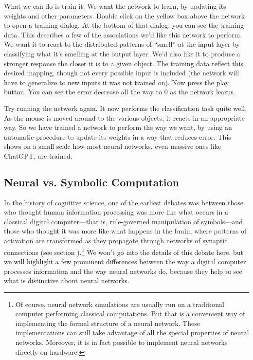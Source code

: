 What we can do is train it. We want the network to learn, by updating its weights and other parameters.  Double click on the yellow box above the network to open a training dialog. At the bottom of that dialog, you can see the training data. This describes a few of the associations we'd like this network to perform.  We want it to react to the distributed patterns of ``smell'' at the input layer by classifying what it's smelling at the output layer. We'd also like it to produce a stronger response the closer it is to a given object.  The training data reflect this desired mapping, though not every possible input is included (the network will have to generalize to new inputs it was not trained on). Now press the play button. You can see the error decrease all the way to 0 as the network learns.

Try running the network again. It now performs the classification task quite well.  As the mouse is moved around to the various objects, it reacts in an appropriate way. So we have trained a network to perform the way we want, by using an automatic procedure to update its weights in a way that reduces error. This shows on a small scale how most neural networks, even massive ones like ChatGPT, are trained.


\subsection{Neural vs. Symbolic Computation}\label{classicalAIComparison}

In the history of cognitive science, one of the earliest debates was between those who thought human information processing was more like what occurs in a classical digital computer---that is, rule-governed manipulation of symbols---and those who thought it was more like what happens in the brain, where patterns of activation are transformed as they propagate through networks of synaptic connections (see section ).\footnote{Of course, neural network simulations are usually run on a traditional computer performing classical computations. But that is a convenient way of implementing the formal structure of a neural network. These implementations can still take advantage of all the special properties of neural networks. Moreover, it is in fact possible to implement neural networks directly on hardware.} We won't go into the details of this debate here, but we will highlight a few prominent differences between the way a digital computer processes information and the way neural networks do, because they help to see what is distinctive about neural networks.

